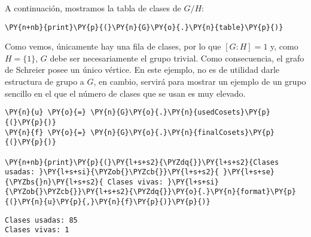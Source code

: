 \begin{enumerate}
A continuación, mostramos la tabla de clases de $G/H$:

    \begin{tcolorbox}[breakable, size=fbox, boxrule=1pt, pad at break*=1mm,colback=cellbackground, colframe=cellborder]
\begin{Verbatim}[commandchars=\\\{\}]
\PY{n+nb}{print}\PY{p}{(}\PY{n}{G}\PY{o}{.}\PY{n}{table}\PY{p}{)}
\end{Verbatim}
\end{tcolorbox}

    \begin{center}
    \end{center}

Como vemos, únicamente hay una fila de clases, por lo que $[G:H]=1$ y, como $H=\{1\}$, $G$ debe ser necesariamente el grupo trivial. Como consecuencia, el grafo de Schreier posee un único vértice.
En este ejemplo, no es de utilidad darle estructura de grupo a $G$, en cambio, servirá para mostrar un ejemplo de un grupo sencillo en el que el número de clases que se usan es muy elevado. 

    \begin{tcolorbox}[breakable, size=fbox, boxrule=1pt, pad at break*=1mm,colback=cellbackground, colframe=cellborder]
\begin{Verbatim}[commandchars=\\\{\}]
\PY{n}{u} \PY{o}{=} \PY{n}{G}\PY{o}{.}\PY{n}{usedCosets}\PY{p}{(}\PY{p}{)}
\PY{n}{f} \PY{o}{=} \PY{n}{G}\PY{o}{.}\PY{n}{finalCosets}\PY{p}{(}\PY{p}{)}

\PY{n+nb}{print}\PY{p}{(}\PY{l+s+s2}{\PYZdq{}}\PY{l+s+s2}{Clases usadas: }\PY{l+s+si}{\PYZob{}\PYZcb{}}\PY{l+s+s2}{ }\PY{l+s+se}{\PYZbs{}n}\PY{l+s+s2}{ Clases vivas: }\PY{l+s+si}{\PYZob{}\PYZcb{}}\PY{l+s+s2}{\PYZdq{}}\PY{o}{.}\PY{n}{format}\PY{p}{(}\PY{n}{u}\PY{p}{,}\PY{n}{f}\PY{p}{)}\PY{p}{)}
\end{Verbatim}
\end{tcolorbox}


\begin{tcolorbox}[breakable, size=fbox, boxrule=.5pt, pad at break*=1mm, opacityfill=0]
    \begin{Verbatim}[commandchars=\\\{\}]
Clases usadas: 85
Clases vivas: 1
\end{Verbatim}
\end{tcolorbox}



\end{enumerate}
